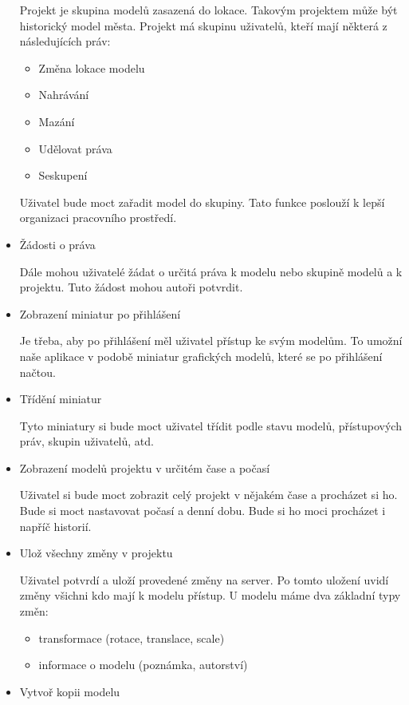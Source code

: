 \documentclass[thesis=B,czech]{FITthesis}[2012/06/26]
\begin{document}
\begin{itemize}
                Projekt je skupina modelů zasazená do lokace. Takovým projektem může být historický model města. Projekt má skupinu uživatelů, kteří mají některá z následujících práv:
                \begin{itemize}
                    \item Změna lokace modelu
                    \item Nahrávání
                    \item Mazání
                    \item Udělovat práva
                    \item Seskupení
                \end{itemize}
                Uživatel bude moct zařadit model do skupiny. Tato funkce poslouží k lepší organizaci pracovního prostředí.
                \item Žádosti o práva
                
                Dále mohou uživatelé žádat o určitá práva k modelu nebo skupině modelů a k projektu. Tuto žádost mohou autoři potvrdit.
                \item Zobrazení miniatur po přihlášení
                
                Je třeba, aby po přihlášení měl uživatel přístup ke svým modelům. To umožní naše aplikace v podobě miniatur grafických modelů, které se po přihlášení načtou.
                \item Třídění miniatur
                
                Tyto miniatury si bude moct uživatel třídit podle stavu modelů, přístupových práv, skupin uživatelů, atd.
                \item Zobrazení modelů projektu v určitém čase a počasí
                
                Uživatel si bude moct zobrazit celý projekt v nějakém čase a procházet si ho. Bude si moct nastavovat počasí a denní dobu. Bude si ho moci procházet i napříč historií.
                \item Ulož všechny změny v projektu
                
                Uživatel potvrdí a uloží provedené změny na server. Po tomto uložení uvidí změny všichni kdo mají k modelu přístup.
                U modelu máme dva základní typy změn:
                \begin{itemize}
                    \item transformace (rotace, translace, scale)
                    \item informace o modelu (poznámka, autorství)
                \end{itemize}
                \item Vytvoř kopii modelu
                

\end{itemize}
\end{document}
